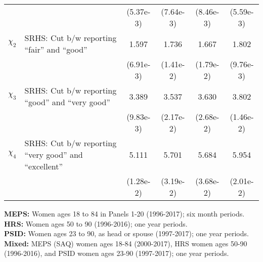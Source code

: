 \begin{table}[H]
\begin{center}
{\begin{tabular}{clcccc}
 & & (5.37e-3) & (7.64e-3) & (8.46e-3) & (5.59e-3) \\
$\chi_2$ & SRHS: Cut b/w reporting ``fair'' and ``good'' & 1.597 & 1.736 & 1.667 & 1.802 \\
 & & (6.91e-3) & (1.41e-2) & (1.79e-2) & (9.76e-3) \\
$\chi_3$ & SRHS: Cut b/w reporting ``good'' and ``very good'' & 3.389 & 3.537 & 3.630 & 3.802 \\
 & & (9.83e-3) & (2.17e-2) & (2.68e-2) & (1.46e-2) \\
$\chi_4$ & SRHS: Cut b/w reporting ``very good'' and ``excellent'' & 5.111 & 5.701 & 5.684 & 5.954 \\
 & & (1.28e-2) & (3.19e-2) & (3.68e-2) & (2.01e-2) \\
\hline\hline
\end{tabular}
 } 
 \usebox{\WomenParamsBox}  
\settowidth\TableWidth{\usebox{\WomenParamsBox}} %
\vspace{0.0cm} \parbox{\TableWidth}{
  \begin{flushleft}
\textbf{MEPS:} Women ages 18 to 84 in Panels 1-20 (1996-2017); six month periods.\\
\textbf{HRS:} Women ages 50 to 90 (1996-2016); one year periods.\\
\textbf{PSID:} Women ages 23 to 90, as head or spouse (1997-2017); one year periods.\\
\textbf{Mixed:} MEPS (SAQ) women ages 18-84 (2000-2017), HRS women ages 50-90 (1996-2016), and PSID women ages 23-90 (1997-2017); one year periods.\\
  \end{flushleft}
}
\end{center}
\end{table}
